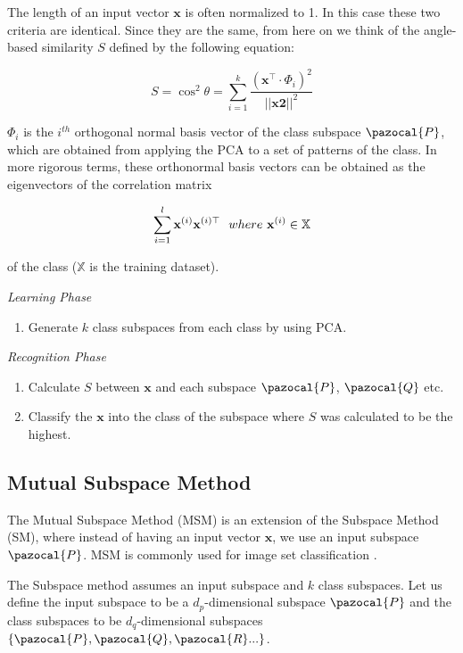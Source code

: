 The length of an input vector $\mathbf{x}$ is often normalized to 1. In this case these two criteria are identical. Since they are the same, from here on we think of the angle-based similarity $S$ defined by the following equation:

\[S = \cos^2{\theta} = \sum^{k}_{i=1} \frac{(\mathbf{x}^\top \cdot \Phi_i)^2}{||\mathbf{x2}||^2}\]

$\Phi_i$ is the $i^{th}$ orthogonal normal basis vector of the class subspace $\pazocal{P}$, which are obtained from applying the PCA to a set of patterns of the class. In more rigorous terms, these orthonormal basis vectors can be obtained as the eigenvectors of the correlation matrix

\[\sum^{l}_{i=1}\mathbf{x}^{(i)}\mathbf{x}^{(i)\top}  \ \ where \\ \ \mathbf{x}^{(i)} \in \mathbb{X} \]

\noindent of the class ($\mathbb{X}$ is the training dataset).

{\setlength{\parindent}{0cm} \vspace{5mm}

\emph{Learning Phase}

\begin{enumerate}
    \item Generate $k$ class subspaces from each class by using PCA.
\end{enumerate}

\emph{Recognition Phase}

\begin{enumerate}
    \item Calculate $S$ between $\mathbf{x}$ and each subspace $\pazocal{P}$, $\pazocal{Q}$ etc.
    \item Classify the $\mathbf{x}$ into the class of the subspace where $S$ was calculated to be the highest.
\end{enumerate}
}
\newpage

\subsection{Mutual Subspace Method}

The Mutual Subspace Method (MSM) is an extension of the Subspace Method (SM), where instead of having an input vector $\mathbf{x}$, we use an input subspace $\pazocal{P}$. MSM is commonly used for image set classification \cite{sakai2019gait}.

The Subspace method assumes an input subspace and $k$ class subspaces. Let us define the input subspace to be a $d_p$-dimensional subspace $\pazocal{P}$ and the class subspaces to be $d_q$-dimensional subspaces $\{\pazocal{P}, \pazocal{Q}, \pazocal{R}...\}$.

